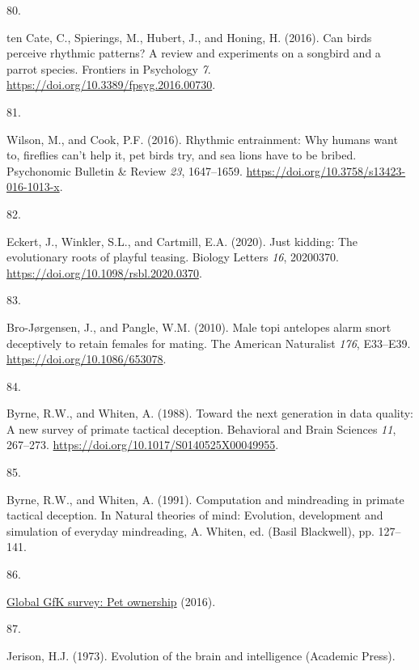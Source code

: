 \documentclass[
  man, donotrepeattitle,floatsintext]{apa6}
\newlength{\cslhangindent}
\newlength{\csllabelwidth}
\newlength{\cslentryspacingunit} %
\newenvironment{CSLReferences}[2] %
 {%
  \setlength{\parindent}{0pt}
  \ifodd #1
  \let\oldpar\par
  \def\par{\hangindent=\cslhangindent\oldpar}
  \fi
  \setlength{\parskip}{#2\cslentryspacingunit}
 }%
 {}
\newcommand{\CSLLeftMargin}[1]{\parbox[t]{\csllabelwidth}{#1}}
\newcommand{\CSLRightInline}[1]{\parbox[t]{\linewidth - \csllabelwidth}{#1}\break}
\begin{document}
\begin{CSLReferences}{0}{0}
\leavevmode{}%
\CSLLeftMargin{80. }%
\CSLRightInline{ten Cate, C., Spierings, M., Hubert, J., and Honing, H. (2016). Can birds perceive rhythmic patterns? A review and experiments on a songbird and a parrot species. Frontiers in Psychology \emph{7}. \url{https://doi.org/10.3389/fpsyg.2016.00730}.}

\leavevmode{}%
\CSLLeftMargin{81. }%
\CSLRightInline{Wilson, M., and Cook, P.F. (2016). Rhythmic entrainment: Why humans want to, fireflies can't help it, pet birds try, and sea lions have to be bribed. Psychonomic Bulletin \& Review \emph{23}, 1647--1659. \url{https://doi.org/10.3758/s13423-016-1013-x}.}

\leavevmode{}%
\CSLLeftMargin{82. }%
\CSLRightInline{Eckert, J., Winkler, S.L., and Cartmill, E.A. (2020). Just kidding: The evolutionary roots of playful teasing. Biology Letters \emph{16}, 20200370. \url{https://doi.org/10.1098/rsbl.2020.0370}.}

\leavevmode{}%
\CSLLeftMargin{83. }%
\CSLRightInline{Bro-Jørgensen, J., and Pangle, W.M. (2010). Male topi antelopes alarm snort deceptively to retain females for mating. The American Naturalist \emph{176}, E33--E39. \url{https://doi.org/10.1086/653078}.}

\leavevmode{}%
\CSLLeftMargin{84. }%
\CSLRightInline{Byrne, R.W., and Whiten, A. (1988). Toward the next generation in data quality: A new survey of primate tactical deception. Behavioral and Brain Sciences \emph{11}, 267--273. \url{https://doi.org/10.1017/S0140525X00049955}.}

\leavevmode{}%
\CSLLeftMargin{85. }%
\CSLRightInline{Byrne, R.W., and Whiten, A. (1991). Computation and mindreading in primate tactical deception. In Natural theories of mind: Evolution, development and simulation of everyday mindreading, A. Whiten, ed. (Basil Blackwell), pp. 127--141.}

\leavevmode{}%
\CSLLeftMargin{86. }%
\CSLRightInline{\href{http://www.gfk.com/global-studies/global-studies-pet-ownership}{Global GfK survey: Pet ownership} (2016).}

\leavevmode{}%
\CSLLeftMargin{87. }%
\CSLRightInline{Jerison, H.J. (1973). Evolution of the brain and intelligence (Academic Press).}


\end{CSLReferences}
\end{document}
